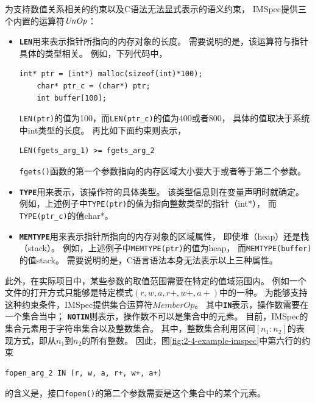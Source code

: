 为支持数值关系相关的约束以及C语法无法显式表示的语义约束，
IMSpec提供三个内置的运算符$\mathit{UnOp}$：
\begin{itemize}
	\item 
	\textbf{\texttt{LEN}}用来表示指针所指向的内存对象的长度。
	需要说明的是，该运算符与指针具体的类型相关。
	例如，下列代码中，
	\begin{lstlisting}[language={[ANSI]C},
	basicstyle=\linespread{0.8}\listingsfont,
	numbers=none,
	xleftmargin=.15\textwidth]
	int* ptr = (int*) malloc(sizeof(int)*100);
	char* ptr_c = (char*) ptr;
	int buffer[100];
	\end{lstlisting}
	\texttt{LEN(ptr)}的值为100，而\texttt{LEN(ptr\_c)}的值为400或者800，
	具体的值取决于系统中int类型的长度。
	再比如下面约束则表示，
	\begin{lstlisting}[language={[ANSI]C},
	basicstyle=\linespread{0.8}\listingsfont,
	numbers=none,
	xleftmargin=.15\textwidth]
	LEN(fgets_arg_1) >= fgets_arg_2
	\end{lstlisting}
	\texttt{fgets()}函数的第一个参数指向的内存区域大小要大于或者等于第二个参数。
	\item 
	\textbf{\texttt{TYPE}}用来表示，该操作符的具体类型。
	该类型信息则在变量声明时就确定。
	例如，上述例子中\texttt{TYPE(ptr)}的值为指向整数类型的指针（int*），
	而\texttt{TYPE(ptr\_c)}的值char*。
	\item 
	 \textbf{\texttt{MEMTYPE}}用来表示指针所指向的内存对象的区域属性，
	即使堆（heap）还是栈（stack）。
	例如，上述例子中\texttt{MEMTYPE(ptr)}的值为heap，
	而\texttt{MEMTYPE(buffer)}的值stack。
	需要说明的是，C语言语法本身无法表示以上三种属性。
\end{itemize}

此外，在实际项目中，某些参数的取值范围需要在特定的值域范围内。
例如一个文件的打开方式只能够是特定模式$(r, w, a, r+, w+, a+)$中的一种。
为能够支持这种约束条件，IMSpec提供集合运算符$\mathit{MemberOp}$。
其中\texttt{\textbf{IN}}表示，操作数需要在一个集合当中；
\texttt{\textbf{NOTIN}}则表示，操作数不可以是集合中的元素。
目前，IMSpec的集合元素用于字符串集合以及整数集合。
其中，整数集合利用区间$[n_1:n_2]$的表现方式，即从$n_1$到$n_2$的所有整数。
因此，图\ref{fig:2-4-example-imspec}中第六行的约束
\begin{lstlisting}[language={[ANSI]C},
basicstyle=\linespread{0.8}\listingsfont,
numbers=none,
xleftmargin=.3\textwidth]
fopen_arg_2 IN (r, w, a, r+, w+, a+)
\end{lstlisting}
的含义是，接口\texttt{fopen()}的第二个参数需要是这个集合中的某个元素。



